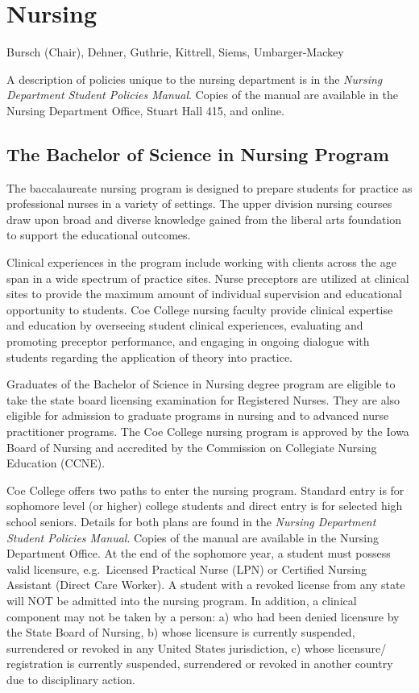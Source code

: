 \documentclass[
  letterpaper,
]{scrbook}
\begin{document}
\hypertarget{nursing}{%
\section{Nursing}\label{nursing}}

Bursch (Chair), Dehner, Guthrie, Kittrell, Siems, Umbarger-Mackey

A description of policies unique to the nursing department is in the
\emph{Nursing Department Student Policies Manual}. Copies of the manual
are available in the Nursing Department Office, Stuart Hall 415, and
online.

\hypertarget{the-bachelor-of-science-in-nursing-program}{%
\subsection{The Bachelor of Science in Nursing
Program}\label{the-bachelor-of-science-in-nursing-program}}

The baccalaureate nursing program is designed to prepare students for
practice as professional nurses in a variety of settings. The upper
division nursing courses draw upon broad and diverse knowledge gained
from the liberal arts foundation to support the educational outcomes.

Clinical experiences in the program include working with clients across
the age span in a wide spectrum of practice sites. Nurse preceptors are
utilized at clinical sites to provide the maximum amount of individual
supervision and educational opportunity to students. Coe College nursing
faculty provide clinical expertise and education by overseeing student
clinical experiences, evaluating and promoting preceptor performance,
and engaging in ongoing dialogue with students regarding the application
of theory into practice.

Graduates of the Bachelor of Science in Nursing degree program are
eligible to take the state board licensing examination for Registered
Nurses. They are also eligible for admission to graduate programs in
nursing and to advanced nurse practitioner programs. The Coe College
nursing program is approved by the Iowa Board of Nursing and accredited
by the Commission on Collegiate Nursing Education (CCNE).

Coe College offers two paths to enter the nursing program. Standard
entry is for sophomore level (or higher) college students and direct
entry is for selected high school seniors. Details for both plans are
found in the \emph{Nursing Department Student Policies Manual}. Copies
of the manual are available in the Nursing Department Office. At the end
of the sophomore year, a student must possess valid licensure,
e.g.~Licensed Practical Nurse (LPN) or Certified Nursing Assistant
(Direct Care Worker). A student with a revoked license from any state
will NOT be admitted into the nursing program. In addition, a clinical
component may not be taken by a person: a) who had been denied licensure
by the State Board of Nursing, b) whose licensure is currently
suspended, surrendered or revoked in any United States jurisdiction, c)
whose licensure/ registration is currently suspended, surrendered or
revoked in another country due to disciplinary action.
\end{document}
